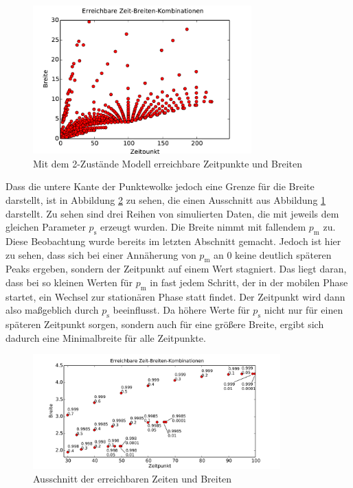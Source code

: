 \begin{figure}[h]
\centering
\includegraphics[width=0.75\textwidth]{bilder/2s_zeitbreiten_ohnep}
\caption{Mit dem 2-Zustände Modell erreichbare Zeitpunkte und Breiten}
\label{Grenzen_2p_ohnep}
\end{figure}

Dass die untere Kante der Punktewolke jedoch eine Grenze für die Breite darstellt, ist in Abbildung \ref{Grenzen_2p_ausschnitt} zu sehen, die einen Ausschnitt aus Abbildung \ref{Grenzen_2p_ohnep} darstellt. Zu sehen sind drei Reihen von simulierten Daten, die mit jeweils dem gleichen Parameter $p_{\text{s}}$ erzeugt wurden. Die Breite nimmt mit fallendem $p_{\text{m}}$ zu. Diese Beobachtung wurde bereits im letzten Abschnitt gemacht. Jedoch ist hier zu sehen, dass sich bei einer Annäherung von $p_{\text{m}}$ an $0$ keine deutlich späteren Peaks ergeben, sondern der Zeitpunkt auf einem Wert stagniert. Das liegt daran, dass bei so kleinen Werten für $p_{\text{m}}$ in fast jedem Schritt, der in der mobilen Phase startet, ein Wechsel zur stationären Phase statt findet. Der Zeitpunkt wird dann also maßgeblich durch $p_{\text{s}}$ beeinflusst. Da höhere Werte für $p_{\text{s}}$ nicht nur für einen späteren Zeitpunkt sorgen, sondern auch für eine größere Breite, ergibt sich dadurch eine Minimalbreite für alle Zeitpunkte.

\begin{figure}[h]
\centering
\includegraphics[width=0.85\textwidth]{bilder/2s_zeitbreiten_ausschnitt.pdf}
\caption{Ausschnitt der erreichbaren Zeiten und Breiten}
\label{Grenzen_2p_ausschnitt}
\end{figure}

